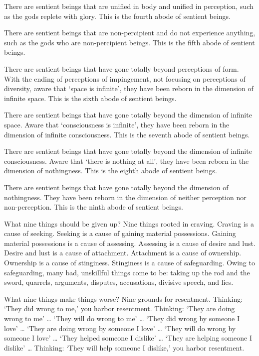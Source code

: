\documentclass[12pt,openany]{book}%
\begin{document}
There are sentient beings that are unified in body and unified in perception, such as the gods replete with glory. This is the fourth abode of sentient beings. 

There are sentient beings that are non-percipient and do not experience anything, such as the gods who are non-percipient beings. This is the fifth abode of sentient beings. 

There are sentient beings that have gone totally beyond perceptions of form. With the ending of perceptions of impingement, not focusing on perceptions of diversity, aware that ‘space is infinite’, they have been reborn in the dimension of infinite space. This is the sixth abode of sentient beings. 

There are sentient beings that have gone totally beyond the dimension of infinite space. Aware that ‘consciousness is infinite’, they have been reborn in the dimension of infinite consciousness. This is the seventh abode of sentient beings. 

There are sentient beings that have gone totally beyond the dimension of infinite consciousness. Aware that ‘there is nothing at all’, they have been reborn in the dimension of nothingness. This is the eighth abode of sentient beings. 

There are sentient beings that have gone totally beyond the dimension of nothingness. They have been reborn in the dimension of neither perception nor non-perception. This is the ninth abode of sentient beings. 

What nine things should be given up? Nine things rooted in craving. Craving is a cause of seeking. Seeking is a cause of gaining material possessions. Gaining material possessions is a cause of assessing. Assessing is a cause of desire and lust. Desire and lust is a cause of attachment. Attachment is a cause of ownership. Ownership is a cause of stinginess. Stinginess is a cause of safeguarding. Owing to safeguarding, many bad, unskillful things come to be: taking up the rod and the sword, quarrels, arguments, disputes, accusations, divisive speech, and lies. 

What nine things make things worse? Nine grounds for resentment. Thinking: ‘They did wrong to me,’ you harbor resentment. Thinking: ‘They are doing wrong to me’ … ‘They will do wrong to me’ … ‘They did wrong by someone I love’ … ‘They are doing wrong by someone I love’ … ‘They will do wrong by someone I love’ … ‘They helped someone I dislike’ … ‘They are helping someone I dislike’ … Thinking: ‘They will help someone I dislike,’ you harbor resentment. 
\end{document}
